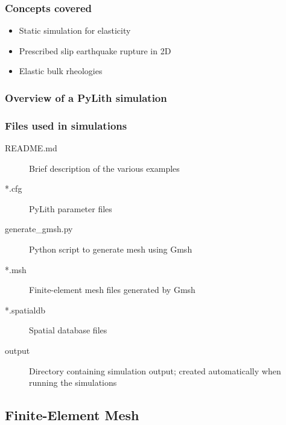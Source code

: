 \documentclass[aspectratio=169]{beamer}
\begin{document}
\begin{frame}
  \frametitle{Concepts covered}
  \summary{}

  \begin{itemize}
  \item Static simulation for elasticity
  \item Prescribed slip earthquake rupture in 2D
  \item Elastic bulk rheologies
  \end{itemize}
  
\end{frame}

\begin{frame}
  \frametitle{Overview of a PyLith simulation}
  \summary{}

  
\end{frame}


\begin{frame}
  \frametitle{Files used in simulations}

  \begin{description}
  \item[README.md] Brief description of the various examples
  \item[*.cfg] PyLith parameter files
  \item[generate\_gmsh.py] Python script to generate mesh using Gmsh
  \item[*.msh] Finite-element mesh files generated by Gmsh
  \item[*.spatialdb] Spatial database files
  \item[output] Directory containing simulation output; created automatically when running the simulations
  \end{description}

\end{frame}


\subsection{Finite-Element Mesh}
\end{document}

